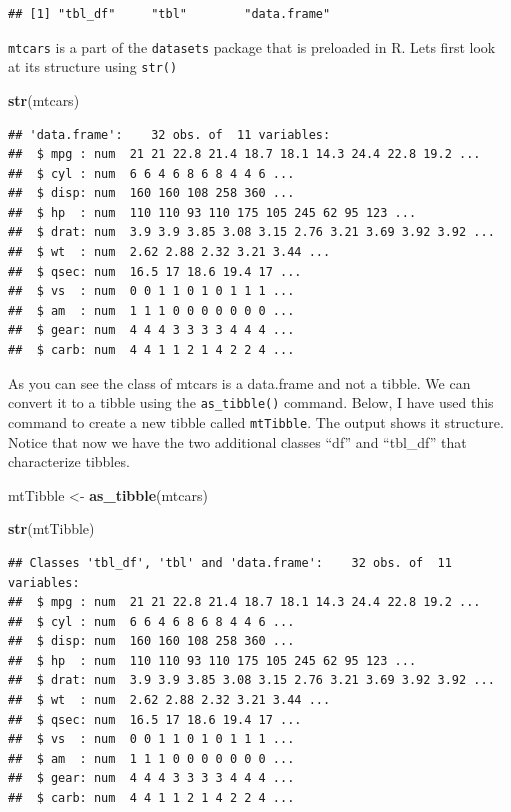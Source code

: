 \documentclass[]{article}
\newenvironment{Shaded}{\begin{snugshade}}{\end{snugshade}}
\newcommand{\KeywordTok}[1]{\textcolor[rgb]{0.13,0.29,0.53}{\textbf{#1}}}
\newcommand{\StringTok}[1]{\textcolor[rgb]{0.31,0.60,0.02}{#1}}
\newcommand{\NormalTok}[1]{#1}
\begin{document}
\begin{verbatim}
## [1] "tbl_df"     "tbl"        "data.frame"
\end{verbatim}

\texttt{mtcars} is a part of the \texttt{datasets} package that is
preloaded in R. Lets first look at its structure using \texttt{str()}

\begin{Shaded}
\begin{Highlighting}[]
\KeywordTok{str}\NormalTok{(mtcars)}
\end{Highlighting}
\end{Shaded}

\begin{verbatim}
## 'data.frame':    32 obs. of  11 variables:
##  $ mpg : num  21 21 22.8 21.4 18.7 18.1 14.3 24.4 22.8 19.2 ...
##  $ cyl : num  6 6 4 6 8 6 8 4 4 6 ...
##  $ disp: num  160 160 108 258 360 ...
##  $ hp  : num  110 110 93 110 175 105 245 62 95 123 ...
##  $ drat: num  3.9 3.9 3.85 3.08 3.15 2.76 3.21 3.69 3.92 3.92 ...
##  $ wt  : num  2.62 2.88 2.32 3.21 3.44 ...
##  $ qsec: num  16.5 17 18.6 19.4 17 ...
##  $ vs  : num  0 0 1 1 0 1 0 1 1 1 ...
##  $ am  : num  1 1 1 0 0 0 0 0 0 0 ...
##  $ gear: num  4 4 4 3 3 3 3 4 4 4 ...
##  $ carb: num  4 4 1 1 2 1 4 2 2 4 ...
\end{verbatim}

As you can see the class of mtcars is a data.frame and not a tibble. We
can convert it to a tibble using the \texttt{as\_tibble()} command.
Below, I have used this command to create a new tibble called
\texttt{mtTibble}. The output shows it structure. Notice that now we
have the two additional classes ``df'' and ``tbl\_df'' that characterize
tibbles.

\begin{Shaded}
\begin{Highlighting}[]
\NormalTok{mtTibble <-}\StringTok{ }\KeywordTok{as_tibble}\NormalTok{(mtcars)}

\KeywordTok{str}\NormalTok{(mtTibble)}
\end{Highlighting}
\end{Shaded}

\begin{verbatim}
## Classes 'tbl_df', 'tbl' and 'data.frame':    32 obs. of  11 variables:
##  $ mpg : num  21 21 22.8 21.4 18.7 18.1 14.3 24.4 22.8 19.2 ...
##  $ cyl : num  6 6 4 6 8 6 8 4 4 6 ...
##  $ disp: num  160 160 108 258 360 ...
##  $ hp  : num  110 110 93 110 175 105 245 62 95 123 ...
##  $ drat: num  3.9 3.9 3.85 3.08 3.15 2.76 3.21 3.69 3.92 3.92 ...
##  $ wt  : num  2.62 2.88 2.32 3.21 3.44 ...
##  $ qsec: num  16.5 17 18.6 19.4 17 ...
##  $ vs  : num  0 0 1 1 0 1 0 1 1 1 ...
##  $ am  : num  1 1 1 0 0 0 0 0 0 0 ...
##  $ gear: num  4 4 4 3 3 3 3 4 4 4 ...
##  $ carb: num  4 4 1 1 2 1 4 2 2 4 ...
\end{verbatim}
\end{document}
